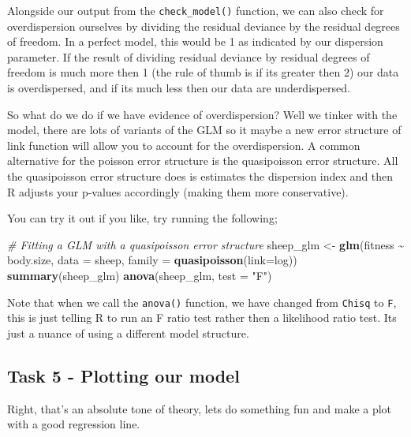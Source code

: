 \documentclass[
]{book}
\newenvironment{Shaded}{\begin{snugshade}}{\end{snugshade}}
\newcommand{\AttributeTok}[1]{\textcolor[rgb]{0.13,0.29,0.53}{#1}}
\newcommand{\CommentTok}[1]{\textcolor[rgb]{0.56,0.35,0.01}{\textit{#1}}}
\newcommand{\FunctionTok}[1]{\textcolor[rgb]{0.13,0.29,0.53}{\textbf{#1}}}
\newcommand{\NormalTok}[1]{#1}
\newcommand{\OtherTok}[1]{\textcolor[rgb]{0.56,0.35,0.01}{#1}}
\newcommand{\SpecialCharTok}[1]{\textcolor[rgb]{0.81,0.36,0.00}{\textbf{#1}}}
\newcommand{\StringTok}[1]{\textcolor[rgb]{0.31,0.60,0.02}{#1}}
\begin{document}
Alongside our output from the \texttt{check\_model()} function, we can also check for overdispersion ourselves by dividing the residual deviance by the residual degrees of freedom. In a perfect model, this would be 1 as indicated by our dispersion parameter. If the result of dividing residual deviance by residual degrees of freedom is much more then 1 (the rule of thumb is if its greater then 2) our data is overdispersed, and if its much less then our data are underdispersed.

So what do we do if we have evidence of overdispersion? Well we tinker with the model, there are lots of variants of the GLM so it maybe a new error structure of link function will allow you to account for the overdispersion. A common alternative for the poisson error structure is the quasipoisson error structure. All the quasipoisson error structure does is estimates the dispersion index and then R adjusts your p-values accordingly (making them more conservative).

You can try it out if you like, try running the following;

\begin{Shaded}
\begin{Highlighting}[]
\CommentTok{\# Fitting a GLM with a quasipoisson error structure}
\NormalTok{sheep\_glm }\OtherTok{\textless{}{-}} \FunctionTok{glm}\NormalTok{(fitness }\SpecialCharTok{\textasciitilde{}}\NormalTok{ body.size, }\AttributeTok{data =}\NormalTok{ sheep, }\AttributeTok{family =} \FunctionTok{quasipoisson}\NormalTok{(}\AttributeTok{link=}\NormalTok{log))}
\FunctionTok{summary}\NormalTok{(sheep\_glm)}
\FunctionTok{anova}\NormalTok{(sheep\_glm, }\AttributeTok{test =} \StringTok{"F"}\NormalTok{)}
\end{Highlighting}
\end{Shaded}

Note that when we call the \texttt{anova()} function, we have changed from \texttt{Chisq} to \texttt{F}, this is just telling R to run an F ratio test rather then a likelihood ratio test. Its just a nuance of using a different model structure.

\subsection{Task 5 - Plotting our model}\label{task-5---plotting-our-model}

Right, that's an absolute tone of theory, lets do something fun and make a plot with a good regression line.
\end{document}
